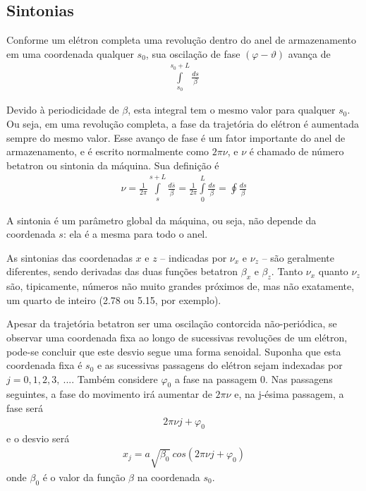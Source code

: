 \subsection{Sintonias}
Conforme um elétron completa uma revolução dentro do anel de armazenamento em uma coordenada qualquer $s_0$, sua oscilação de fase $(\varphi - \vartheta)$ avança de
\begin{align}
	\int\limits_{s_0}^{s_0+L}\frac{ds}{\beta}
\end{align}

Devido à periodicidade de $\beta$, esta integral tem o mesmo valor para qualquer $s_0$. Ou seja, em uma revolução completa, a fase da trajetória do elétron é aumentada sempre do mesmo valor. Esse avanço de fase é um fator importante do anel de armazenamento, e é escrito normalmente como $2\pi \nu$, e $\nu$ é chamado de número betatron ou sintonia da máquina. Sua definição é
\begin{align}
	\nu = \frac{1}{2 \pi}\int\limits_{s}^{s+L}\frac{d\bar{s}}{\beta} = \frac{1}{2 \pi}\int\limits_{0}^{L}\frac{ds}{\beta} = \oint \frac{ds}{\beta}\label{eq:2.60}
\end{align}

A sintonia é um parâmetro global da máquina, ou seja, não depende da coordenada $s$: ela é a mesma para todo o anel.

As sintonias das coordenadas $x$ e $z$ -- indicadas por $\nu_x$ e $\nu_z$ -- são geralmente diferentes, sendo derivadas das duas funções betatron $\beta_x$ e $\beta_z$. Tanto $\nu_x$ quanto $\nu_z$ são, tipicamente, números não muito grandes próximos de, mas não exatamente, um quarto de inteiro (2.78 ou 5.15, por exemplo). 

Apesar da trajetória betatron ser uma oscilação contorcida não-periódica, se observar uma coordenada fixa ao longo de sucessivas revoluções de um elétron, pode-se concluir que este desvio segue uma forma senoidal. Suponha que esta coordenada fixa é $s_0$ e as sucessivas passagens do elétron sejam indexadas por $j=0,1,2,3,\ ...$. Também considere $\varphi_0$ a fase na passagem 0. Nas passagens seguintes, a fase do movimento irá aumentar de $2\pi\nu$ e, na j-ésima passagem, a fase será
\begin{align}
	2\pi\nu j+ \varphi_0
\end{align}
e o desvio será
\begin{align}
	x_j = a\sqrt{\beta_0}\ cos(2\pi\nu j+ \varphi_0)\label{eq:2.61}
\end{align}
onde $\beta_0$ é o valor da função $\beta$ na coordenada $s_0$.

